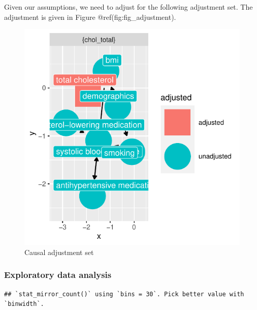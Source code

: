 \documentclass[useAMS,usenatbib,referee]{biom}
\begin{document}
Given our assumptions, we need to adjust for the following adjustment
set. The adjustment is given in Figure @ref(fig:fig\_adjustment).

\begin{figure}
\centering
\includegraphics{final-project_files/figure-latex/fig_adjustment-1.pdf}
\caption{Causal adjustment set}
\end{figure}

\hypertarget{exploratory-data-analysis}{%
\subsubsection{Exploratory data
analysis}\label{exploratory-data-analysis}}

\begin{verbatim}
## `stat_mirror_count()` using `bins = 30`. Pick better value with `binwidth`.
\end{verbatim}
\end{document}
